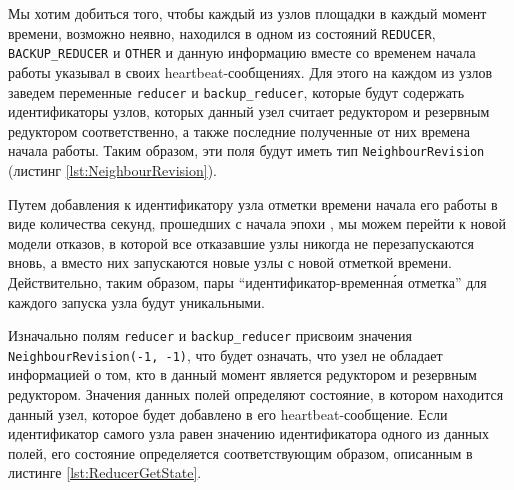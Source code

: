 Мы хотим добиться того, чтобы каждый из узлов площадки в каждый момент времени, возможно неявно, находился в одном из состояний \texttt{REDUCER}, \texttt{BACKUP\_REDUCER} и \texttt{OTHER} и данную информацию вместе со временем начала работы указывал в своих heartbeat-со\-об\-ще\-ниях. Для этого на каждом из узлов заведем переменные \texttt{reducer} и \texttt{backup\_reducer}, которые будут содержать идентификаторы узлов, которых данный узел считает редуктором и резервным редуктором соответственно, а также последние полученные от них времена начала работы. Таким образом, эти поля будут иметь тип \texttt{NeighbourRevision} (листинг \ref{lst:NeighbourRevision}).


Путем добавления к идентификатору узла отметки времени начала его работы в виде количества секунд, прошедших с начала эпохи \cite{UNIX_timestamp}, мы можем перейти к новой модели отказов, в которой все отказавшие узлы никогда не перезапускаются вновь, а вместо них запускаются новые узлы с новой отметкой времени. Действительно, таким образом, пары \enquote{идентификатор-временн\'{а}я отметка} для каждого запуска узла будут уникальными.

Изначально полям \texttt{reducer} и \texttt{backup\_reducer} присвоим значения \texttt{Neigh\-bour\-Re\-vi\-si\-on(-1, -1)}, что будет означать, что узел не обладает информацией о том, кто в данный момент является редуктором и резервным редуктором. Значения данных полей определяют состояние, в котором находится данный узел, которое будет добавлено в его heartbeat-со\-об\-ще\-ние. Если идентификатор самого узла равен значению идентификатора одного из данных полей, его состояние определяется соответствующим образом, описанным в листинге \ref{lst:ReducerGetState}.


